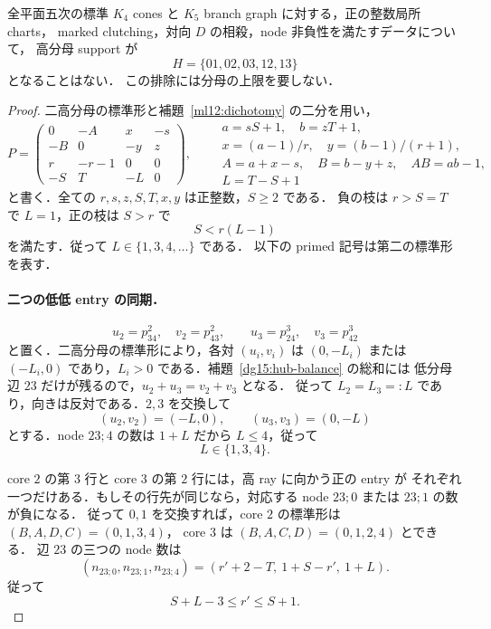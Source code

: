 \begin{theorem}
\label{dg15:no-diamond}
全平面五次の標準 $K_4$ cones と $K_5$ branch graph に対する，正の整数局所 charts，
marked clutching，対向 $D$ の相殺，node 非負性を満たすデータについて，
高分母 support が
\[
 H=\{01,02,03,12,13\}
\]
となることはない．
この排除には分母の上限を要しない．
\end{theorem}

\begin{proof}
二高分母の標準形と補題~\ref{ml12:dichotomy} の二分を用い，
\begin{equation}\label{dg15:canonical}
 P=\begin{pmatrix}
 0&-A&x&-s\\
 -B&0&-y&z\\
 r&-r-1&0&0\\
 -S&T&-L&0
 \end{pmatrix},\qquad
 \begin{gathered}
 a=sS+1,\quad b=zT+1,\\
 x=(a-1)/r,\quad y=(b-1)/(r+1),\\
 A=a+x-s,\quad B=b-y+z,\quad AB=ab-1,\\
 L=T-S+1
 \end{gathered}
\end{equation}
と書く．全ての $r,s,z,S,T,x,y$ は正整数，$S\geq2$ である．
負の枝は $r>S=T$ で $L=1$，正の枝は $S>r$ で
\begin{equation}\label{dg15:positive-range}
 S<r(L-1)
\end{equation}
を満たす．従って $L\in\{1,3,4,\ldots\}$ である．
以下の primed 記号は第二の標準形を表す．

\paragraph{二つの低低 entry の同期．}
\[
 u_2=p^2_{34},\quad v_2=p^2_{43},\qquad
 u_3=p^3_{24},\quad v_3=p^3_{42}
\]
と置く．二高分母の標準形により，各対 $(u_i,v_i)$ は $(0,-L_i)$ または
$(-L_i,0)$ であり，$L_i>0$ である．補題~\ref{dg15:hub-balance} の総和には
低分母辺 $23$ だけが残るので，$u_2+u_3=v_2+v_3$ となる．
従って $L_2=L_3=:L$ であり，向きは反対である．$2,3$ を交換して
\[
 (u_2,v_2)=(-L,0),\qquad (u_3,v_3)=(0,-L)
\]
とする．node $23;4$ の数は $1+L$ だから $L\leq4$，従って
\begin{equation}\label{dg15:three-L}
 L\in\{1,3,4\}.
\end{equation}

core $2$ の第 $3$ 行と core $3$ の第 $2$ 行には，高 ray に向かう正の entry が
それぞれ一つだけある．もしその行先が同じなら，対応する node $23;0$ または $23;1$ の数が負になる．
従って $0,1$ を交換すれば，core $2$ の標準形は $(B,A,D,C)=(0,1,3,4)$，
core $3$ は $(B,A,C,D)=(0,1,2,4)$ とできる．
辺 $23$ の三つの node 数は
\begin{equation}\label{dg15:n23}
 (n_{23;0},n_{23;1},n_{23;4})
 =(r'+2-T,\ 1+S-r',\ 1+L).
\end{equation}
従って
\begin{equation}\label{dg15:rprime-range}
 S+L-3\leq r'\leq S+1.
\end{equation}


\end{proof}
